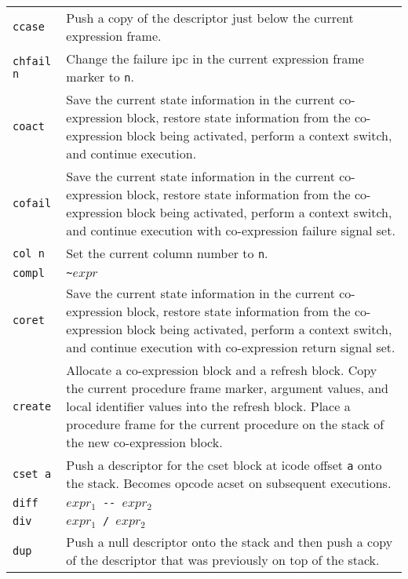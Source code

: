 \begin{xtabular}{l@{\hspace{1.5cm}}p{13.5cm}}
\texttt{ccase} & Push a copy of the descriptor just below the current expression frame.\\

\texttt{chfail n} &  Change the failure ipc in the current expression frame
marker to \texttt{n}.\\

\texttt{coact} & Save the current state information in the current co-expression
block, restore state information from the co-expression block being activated,
perform a context switch, and continue execution.\\

\texttt{cofail} & Save the current state information in the current
co-expression block, restore state information from the co-expression
block being activated, perform a context switch, and continue
execution with co-expression failure signal set.\\

\texttt{col n}  & Set the current column number to \texttt{n}.\\

\texttt{compl} & \texttt{\textasciitilde $expr$}\\

\texttt{coret} & Save the current state information in the current
co-expression block, restore state information from the co-expression
block being activated, perform a context switch, and continue
execution with co-expression return signal set.\\

\texttt{create} & Allocate a co-expression block and a refresh block. Copy the
current procedure frame marker, argument values, and local identifier
values into the refresh block. Place a procedure frame for the current
procedure on the stack of the new co-expression block.\\

\texttt{cset a} & Push a descriptor for the cset block at icode offset
\texttt{a} onto the stack. Becomes opcode acset on subsequent executions.\\

\texttt{diff}  & \texttt{$expr_1$ -{}- $expr_2$}\\

\texttt{div}   & \texttt{$expr_1$ / $expr_2$}\\

\texttt{dup}   & Push a null descriptor onto the stack and then push a copy of
the descriptor that was previously on top of the stack.\\


\end{xtabular}
